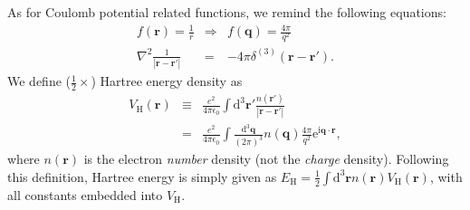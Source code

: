 \documentclass[a4paper,twocolumn,12pt]{article}
\begin{document}
As for Coulomb potential related functions, we remind the following equations:
\begin{eqnarray}
f(\mathbf{r})=\frac{1}{r}&\Rightarrow& f(\mathbf{q})=\frac{4\pi}{q^2}\\
\nabla^2\frac{1}{|\mathbf{r}-\mathbf{r}'|}&=&-4\pi\delta^{(3)}(\mathbf{r}-\mathbf{r}').
\end{eqnarray}
We define ($\frac{1}{2}\times$) Hartree energy density as
\begin{eqnarray}
V_\text{H}(\mathbf{r})&\equiv&\frac{e^2}{4\pi\epsilon_0} \int \mathrm{d}^3\mathbf{r}' \frac{n(\mathbf{r}')}{|\mathbf{r}-\mathbf{r}'|}\nonumber\\
\label{eq:VHcont}&=& \frac{e^2}{4\pi\epsilon_0} \int \frac{\mathrm{d}^3\mathbf{q}}{(2\pi)^3} n(\mathbf{q}) \frac{4\pi}{q^2} \mathrm{e}^{ \mathrm{i} \mathbf{q} \cdot \mathbf{r}},
\end{eqnarray}
where $n(\mathbf{r})$ is the electron {\em number} density (not the
{\em charge} density).  Following this definition, Hartree energy is
simply given as $E_\text{H}=\frac{1}{2} \int \mathrm{d}^3\mathbf{r}
n(\mathbf{r}) V_\text{H}(\mathbf{r})$, with all constants embedded
into $V_\text{H}$.
\end{document}
